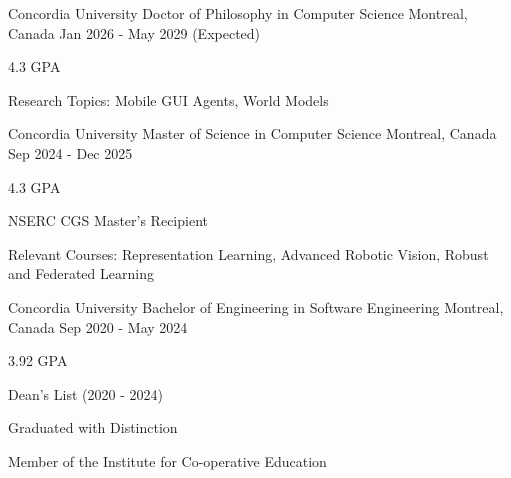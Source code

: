 

\begin{cventries}

  \cventry
    {Concordia University} %
    {Doctor of Philosophy in Computer Science} %
    {Montreal, Canada} %
    {Jan 2026 - May 2029 (Expected)} %
    {
      \begin{cvitems} %
        \item {4.3 GPA}
        \item {Research Topics: Mobile GUI Agents, World Models}
      \end{cvitems}
    }

  \cventry
    {Concordia University} %
    {Master of Science in Computer Science} %
    {Montreal, Canada} %
    {Sep 2024 - Dec 2025} %
    {
      \begin{cvitems} %
        \item {4.3 GPA}
        \item {NSERC CGS Master's Recipient}
        \item {Relevant Courses: Representation Learning, Advanced Robotic Vision, Robust and Federated Learning}
      \end{cvitems}
    }

  \cventry
    {Concordia University} %
    {Bachelor of Engineering in Software Engineering} %
    {Montreal, Canada} %
    {Sep 2020 - May 2024} %
    {
      \begin{cvitems} %
        \item {3.92 GPA}
        \item {Dean's List (2020 - 2024)}
        \item {Graduated with Distinction}
        \item {Member of the Institute for Co-operative Education}
      \end{cvitems}
    }


\end{cventries}
